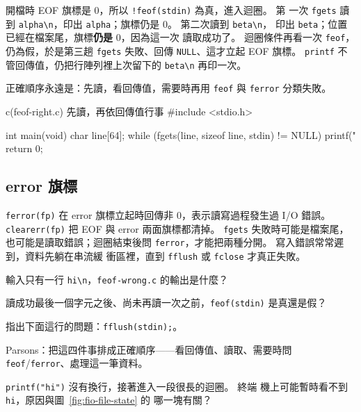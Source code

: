 
開檔時 EOF 旗標是 $0$，所以 \texttt{!feof(stdin)} 為真，進入迴圈。 第
一次 \texttt{fgets} 讀到 \texttt{alpha\textbackslash n}，印出
\texttt{alpha}；旗標仍是 $0$。 第二次讀到 \texttt{beta\textbackslash n}，
印出 \texttt{beta}；位置已經在檔案尾，旗標\textbf{仍是} $0$，因為這一次
讀取成功了。 迴圈條件再看一次 \texttt{feof}，仍為假，於是第三趟
\texttt{fgets} 失敗、回傳 \texttt{NULL}、這才立起 EOF 旗標。
\texttt{printf} 不管回傳值，仍把行陣列裡上次留下的
\texttt{beta\textbackslash n} 再印一次。

正確順序永遠是：先讀，看回傳值，需要時再用 \texttt{feof} 與
\texttt{ferror} 分類失敗。

\begin{example}[label=ex:fio-feof-right]{c}{(feof-right.c) 先讀，再依回傳值行事}
#include <stdio.h>

int main(void) {
    char line[64];
    while (fgets(line, sizeof line, stdin) != NULL) {
        printf("%
    }
    return 0;
}
\end{example}


\subsection{error 旗標}

\texttt{ferror(fp)} 在 error 旗標立起時回傳非 $0$，表示讀寫過程發生過
I/O 錯誤。 \texttt{clearerr(fp)} 把 EOF 與 error 兩面旗標都清掉。
\texttt{fgets} 失敗時可能是檔案尾，也可能是讀取錯誤；迴圈結束後問
\texttt{ferror}，才能把兩種分開。 寫入錯誤常常遲到，資料先躺在串流緩
衝區裡，直到 \texttt{fflush} 或 \texttt{fclose} 才真正失敗。


\begin{drills}[label=drills:fio-state]
\item 輸入只有一行 \texttt{hi\textbackslash n}，\texttt{feof-wrong.c}
的輸出是什麼？
\item 讀成功最後一個字元之後、尚未再讀一次之前，\texttt{feof(stdin)}
是真還是假？
\item 指出下面這行的問題：\texttt{fflush(stdin);}。
\item Parsons：把這四件事排成正確順序——看回傳值、讀取、需要時問
\texttt{feof}/\texttt{ferror}、處理這一筆資料。
\item \texttt{printf("hi")} 沒有換行，接著進入一段很長的迴圈。 終端
機上可能暫時看不到 \texttt{hi}，原因與圖~\ref{fig:fio-file-state} 的
哪一塊有關？
\end{drills}

